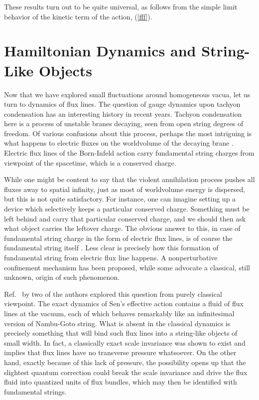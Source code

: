\documentclass[a4paper,12pt]{article}
\begin{document}
These results turn out to be quite universal, 
as follows from the simple limit behavior of the kinetic term of 
the action, (\ref{fff}). 

\section{Hamiltonian Dynamics and String-Like Objects}

Now that we have explored small fluctuations around homogeneous
vacua, let us turn to
dynamics of flux lines. The question of gauge dynamics upon 
tachyon condensation has an interesting history in recent years.
Tachyon condensation here is a process of unstable branes decaying,  
seen from open string degrees of freedom. Of various confusions
about this process, perhaps the most intriguing is what happens
to electric fluxes on the worldvolume of the decaying brane 
\cite{yi,conf,chicago}. 
Electric flux lines of the  Born-Infeld action carry fundamental
string charges from viewpoint of the spacetime, which is a
conserved charge.

While one might be content to say that the violent annihilation process
pushes all fluxes away to spatial infinity, just as most of worldvolume 
energy is dispersed, but this is not quite satisfactory. For 
instance, one can imagine setting up a device which selectively keeps 
a particular conserved charge. Something must be left behind and
carry that particular conserved charge, and we should then ask 
what object carries the leftover charge. The obvious answer to this,
in case of fundamental string charge  in the form of
electric flux lines, is of course the fundamental string itself
\cite{yi}. Less clear is precisely how this formation of
fundamental string from electric flux line happens. A nonperturbative
confinement mechanism has been proposed, while some advocate a
classical, still unknown, origin of such phenomenon.

Ref.~\cite{fluid} by 
two of the authors explored this question from purely classical
viewpoint. The exact dynamics of Sen's effective action contains a
fluid of flux lines at the vacuum, each of which behaves remarkably like 
an infinitesimal version of Nambu-Goto string.  
What is absent
in the classical dynamics is precisely something that will bind such
flux lines into a string-like objects of small width. In fact, a 
classically exact scale invariance was shown to exist and implies that
flux  
lines  have no transverse pressure whatsoever. On the other hand,
exactly because of this lack of pressure, the  possibility opens up that 
the slightest quantum correction could break the scale invariance and
drive the flux fluid into quantized units of flux bundles, which may 
then be identified with fundamental strings.
\end{document}
